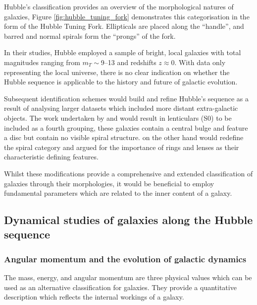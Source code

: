 \documentclass[12pt, twocolumn]{revtex4}    %
\begin{document}
Hubble's classification provides an overview of the morphological natures of galaxies, Figure \ref{fig:hubble_tuning_fork} demonstrates this categorisation in the form of the Hubble Tuning Fork. Ellipticals are placed along the ``handle'', and barred and normal spirals form the ``prongs'' of the fork. 

In their studies, Hubble employed a sample of bright, local galaxies with total magnitudes ranging from $m_T\sim$9--13 and redshifts $z\approx0$. With data only representing the local universe, there is no clear indication on whether the Hubble sequence is applicable to the history and future of galactic evolution. 

Subsequent identification schemes would build and refine Hubble's sequence as a result of analysing larger datasets which included more distant extra-galactic objects. The work undertaken by \cite{1961hag..book.....S, 1975gaun.book....1S} and \cite{1994cag..book.....S} would result in lenticulars (S0) to be included as a fourth grouping, these galaxies contain a central bulge and feature a disc but contain no visible spiral structure. \cite{1959HDP....53..275D} on the other hand would redefine the spiral category and argued for the importance of rings and lenses as their characteristic defining features. 

Whilst these modifications provide a comprehensive and extended classification of galaxies through their morphologies, it would be beneficial to employ fundamental parameters which are related to the inner content of a galaxy.

\subsection{Dynamical studies of galaxies along the Hubble sequence}
\subsubsection{Angular momentum and the evolution of galactic dynamics}
The mass, energy, and angular momentum are three physical values which can be used as an alternative classification for galaxies. They provide a quantitative description which reflects the internal workings of a galaxy.
\end{document}
